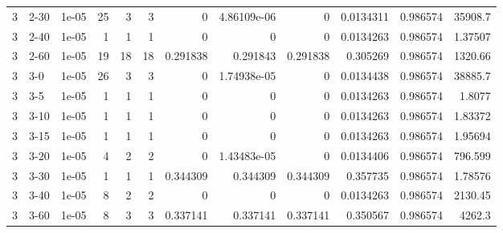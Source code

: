 \begin{tabular}{rlrrrrrrrrrr}
     3 & 2-30   &      1e-05 &          25 &                 3 &                 3 &        0        &     4.86109e-06 &         0        &        0.0134311 &               0.986574 &       35908.7      \\
     3 & 2-40   &      1e-05 &           1 &                 1 &                 1 &        0        &     0           &         0        &        0.0134263 &               0.986574 &           1.37507  \\
     3 & 2-60   &      1e-05 &          19 &                18 &                18 &        0.291838 &     0.291843    &         0.291838 &        0.305269  &               0.986574 &        1320.66     \\
     3 & 3-0    &      1e-05 &          26 &                 3 &                 3 &        0        &     1.74938e-05 &         0        &        0.0134438 &               0.986574 &       38885.7      \\
     3 & 3-5    &      1e-05 &           1 &                 1 &                 1 &        0        &     0           &         0        &        0.0134263 &               0.986574 &           1.8077   \\
     3 & 3-10   &      1e-05 &           1 &                 1 &                 1 &        0        &     0           &         0        &        0.0134263 &               0.986574 &           1.83372  \\
     3 & 3-15   &      1e-05 &           1 &                 1 &                 1 &        0        &     0           &         0        &        0.0134263 &               0.986574 &           1.95694  \\
     3 & 3-20   &      1e-05 &           4 &                 2 &                 2 &        0        &     1.43483e-05 &         0        &        0.0134406 &               0.986574 &         796.599    \\
     3 & 3-30   &      1e-05 &           1 &                 1 &                 1 &        0.344309 &     0.344309    &         0.344309 &        0.357735  &               0.986574 &           1.78576  \\
     3 & 3-40   &      1e-05 &           8 &                 2 &                 2 &        0        &     0           &         0        &        0.0134263 &               0.986574 &        2130.45     \\
     3 & 3-60   &      1e-05 &           8 &                 3 &                 3 &        0.337141 &     0.337141    &         0.337141 &        0.350567  &               0.986574 &        4262.3      \\

\end{tabular}
